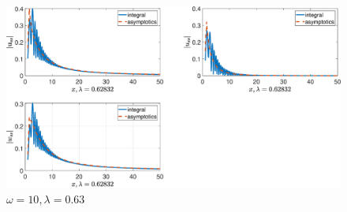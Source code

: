 \begin{figure}[!h]\centering\includegraphics[scale=0.38]{ussw10cp(1)1cp(2)2cs(1)0,3cs(20,5rho(1)1rho(2)2.eps}\caption{$ \omega = 10, \lambda=0.63$}\end{figure}
